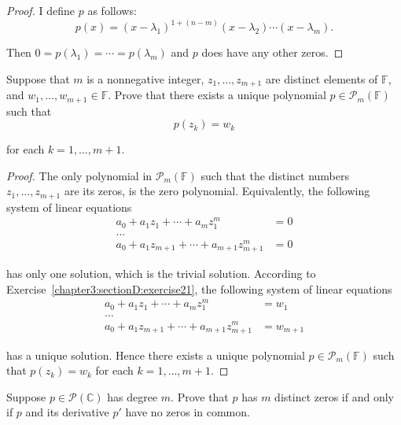 \begin{proof}
    I define $p$ as follows:
    \[
        p(x) = {(x - \lambda_{1})}^{1+(n-m)}(x-\lambda_{2})\cdots (x - \lambda_{m}).
    \]

    Then $0 = p(\lambda_{1}) = \cdots = p(\lambda_{m})$ and $p$ does have any other zeros.
\end{proof}
\newpage

\begin{exercise}\label{chapter4:sectionA:exercise7}
    Suppose that $m$ is a nonnegative integer, $z_{1} , \ldots, z_{m+1}$ are distinct elements of $\mathbb{F}$, and $w_{1} , \ldots, w_{m+1} \in \mathbb{F}$. Prove that there exists a unique polynomial $p\in\mathscr{P}_{m}(\mathbb{F})$ such that
    \[
        p(z_{k}) = w_{k}
    \]

    for each $k = 1,\ldots, m+1$.
\end{exercise}

\begin{proof}
    The only polynomial in $\mathscr{P}_{m}(\mathbb{F})$ such that the distinct numbers $z_{1} , \ldots, z_{m+1}$ are its zeros, is the zero polynomial. Equivalently, the following system of linear equations
    \begin{align*}
        a_{0} + a_{1}z_{1} + \cdots + a_{m}z_{1}^{m}       & = 0 \\
        \ldots                                                   \\
        a_{0} + a_{1}z_{m+1} + \cdots + a_{m+1}z_{m+1}^{m} & = 0
    \end{align*}

    has only one solution, which is the trivial solution. According to Exercise~\ref{chapter3:sectionD:exercise21}, the following system of linear equations
    \begin{align*}
        a_{0} + a_{1}z_{1} + \cdots + a_{m}z_{1}^{m}       & = w_{1}   \\
        \ldots                                                         \\
        a_{0} + a_{1}z_{m+1} + \cdots + a_{m+1}z_{m+1}^{m} & = w_{m+1}
    \end{align*}

    has a unique solution. Hence there exists a unique polynomial $p\in\mathscr{P}_{m}(\mathbb{F})$ such that $p(z_{k}) = w_{k}$ for each $k = 1,\ldots, m+1$.
\end{proof}
\newpage

\begin{exercise}
    Suppose $p\in \mathscr{P}(\mathbb{C})$ has degree $m$. Prove that $p$ has $m$ distinct zeros if and only if $p$ and its derivative $p'$ have no zeros in common.
\end{exercise}


